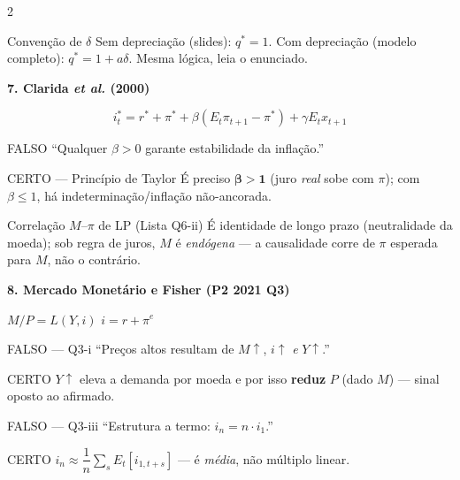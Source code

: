 \documentclass[10pt, a4paper]{article}
\begin{document}
\begin{multicols}{2}
\begin{certobox}{Convenção de $\delta$}
Sem depreciação (slides): $q^*=1$. Com depreciação (modelo completo):
$q^*=1+a\delta$. Mesma lógica, leia o enunciado.
\end{certobox}

\columnbreak
\textbf{\color{azul}\large 7. Clarida \textit{et al.} (2000)}

\begin{formulabox}
\[i_t^{*} = r^{*}+\pi^{*}+\beta(E_t\pi_{t+1}-\pi^{*})+\gamma E_t x_{t+1}\]
\end{formulabox}

\begin{errobox}{FALSO}
``Qualquer $\beta>0$ garante estabilidade da inflação.''
\end{errobox}
\vspace{0.3em}
\begin{certobox}{CERTO --- Princípio de Taylor}
É preciso $\boldsymbol{\beta>1}$ (juro \emph{real} sobe com $\pi$); com
$\beta\le1$, há indeterminação/inflação não-ancorada.
\end{certobox}

\begin{certobox}{Correlação $M$--$\pi$ de LP (Lista Q6-ii)}
É identidade de longo prazo (neutralidade da moeda); sob regra de juros, $M$
é \emph{endógena} --- a causalidade corre de $\pi$ esperada para $M$, não
o contrário.
\end{certobox}

\vspace{0.5em}
\textbf{\color{azul}\large 8. Mercado Monetário e Fisher (P2 2021 Q3)}

\begin{formulabox}
$M/P = L(Y,i)$ \qquad $i = r+\pi^e$
\end{formulabox}

\begin{errobox}{FALSO --- Q3-i}
``Preços altos resultam de $M\uparrow$, $i\uparrow$ \emph{e} $Y\uparrow$.''
\end{errobox}
\vspace{0.3em}
\begin{certobox}{CERTO}
$Y\uparrow$ eleva a demanda por moeda e por isso \textbf{reduz} $P$ (dado
$M$) --- sinal oposto ao afirmado.
\end{certobox}

\begin{errobox}{FALSO --- Q3-iii}
``Estrutura a termo: $i_n = n\cdot i_1$.''
\end{errobox}
\vspace{0.3em}
\begin{certobox}{CERTO}
$i_n \approx \dfrac{1}{n}\sum_s E_t[i_{1,t+s}]$ --- é \emph{média}, não
múltiplo linear.
\end{certobox}


\end{multicols}
\end{document}
